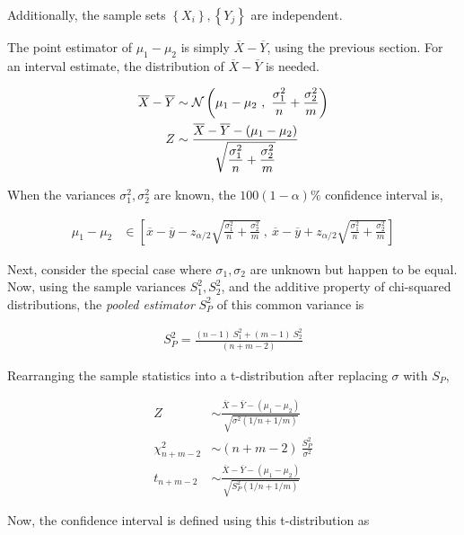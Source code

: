 Additionally, the sample sets $ \left\{X_i\right\}, \left\{Y_j\right\} $ are independent.

The point estimator of $ \mu_1 - \mu_2 $ is simply $ \overline{X} - \overline{Y} $, using the previous section. For an interval estimate, the distribution of $ \overline{X} - \overline{Y} $ is needed.

\begin{align}
	\overline{X} - \overline{Y} &\sim \mathcal{N}\left(\mu_1 - \mu_2\ ,\ \frac{\sigma_1^2}{n} + \frac{\sigma_2^2}{m}\right) \nonumber \\
	Z &\sim \frac{\displaystyle \overline{X} - \overline{Y} - (\mu_1 - \mu_2)}{\displaystyle \sqrt{\frac{\sigma_1^2}{n} + \frac{\sigma_2^2}{m}}} 
\end{align}

When the variances $ \sigma_1^2, \sigma_2^2 $ are known, the $ 100(1-\alpha)\% $ confidence interval is,

\begin{align}
	\mu_1 - \mu_2 &\in \left[ \overline{x} - \overline{y} - z_{\alpha / 2} \sqrt{\frac{\sigma_1^2}{n} + \frac{\sigma_2^2}{m}}\ ,\ \overline{x} - \overline{y} + z_{\alpha / 2} \sqrt{\frac{\sigma_1^2}{n} + \frac{\sigma_2^2}{m}} \right] 
\end{align}


Next, consider the special case where $ \sigma_1, \sigma_2 $ are unknown but happen to be equal. Now, using the sample variances $ S_1^2, S_2^2 $, and the additive property of chi-squared distributions, the \textit{pooled estimator} $ S_P^2 $ of this common variance is

\begin{align}
	S_P^2 = \frac{(n-1)\ S_1^2 + (m-1)\ S_2^2}{(n+m-2)} \nonumber
\end{align}

Rearranging the sample statistics into a t-distribution after replacing $ \sigma $ with $ S_P $,

\begin{align}
	Z &\sim \frac{\overline{X} - \overline{Y} - (\mu_1 - \mu_2)}{\sqrt{\sigma^2(1/n + 1/m)}} \nonumber \\
	\chi^2_{n+m-2} &\sim (n+m-2)\ \frac{S_P^2}{\sigma^2} \nonumber \\
	t_{n+m-2} &\sim \frac{\overline{X} - \overline{Y} - (\mu_1 - \mu_2)}{\sqrt{S_P^2(1/n + 1/m)}}
\end{align}

Now, the confidence interval is defined using this t-distribution as


